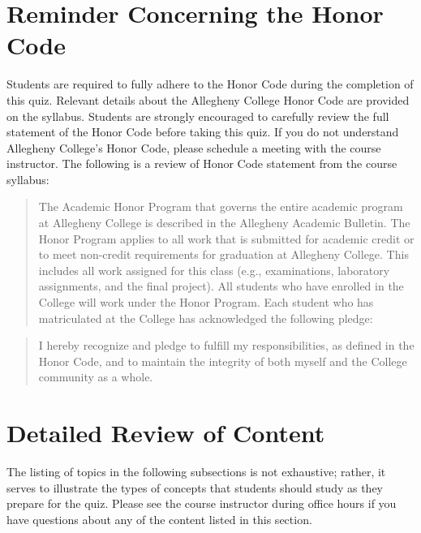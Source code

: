 \documentclass[11pt]{article}
\begin{document}
\section*{Reminder Concerning the Honor Code}

\noindent Students are required to fully adhere to the Honor Code during the
completion of this quiz. Relevant details about the Allegheny College Honor Code
are provided on the syllabus. Students are strongly encouraged to carefully
review the full statement of the Honor Code before taking this quiz. If you do
not understand Allegheny College's Honor Code, please schedule a meeting with
the course instructor. The following is a review of Honor Code statement from
the course syllabus:

\vspace*{-.05in}

\begin{quote}
The Academic Honor Program that governs the entire academic program at
Allegheny College is described in the Allegheny Academic Bulletin. The Honor
Program applies to all work that is submitted for academic credit or to meet
non-credit requirements for graduation at Allegheny College. This includes all
work assigned for this class (e.g., examinations, laboratory assignments, and
the final project). All students who have enrolled in the College will work
under the Honor Program.  Each student who has matriculated at the College has
acknowledged the following pledge:
\end{quote}

\vspace*{-.2in}

\begin{quote}
%
  I hereby recognize and pledge to fulfill my responsibilities, as defined in
  the Honor Code, and to maintain the integrity of both myself and the College
  community as a whole.
%
\end{quote}

\vspace*{-.1in}

\section*{Detailed Review of Content}

The listing of topics in the following subsections is not exhaustive; rather,
it serves to illustrate the types of concepts that students should study as
they prepare for the quiz. Please see the course instructor during office hours
if you have questions about any of the content listed in this section.
\end{document}
